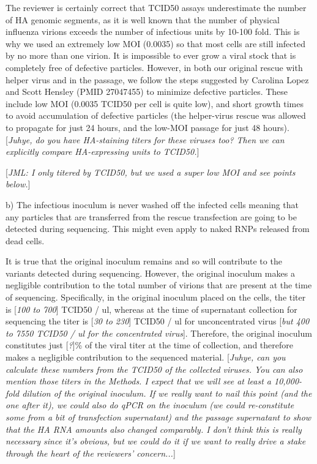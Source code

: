 \documentclass[11pt, oneside]{article}   	%
\newcommand{\comment}[1]{{\color{red}[\textsl{#1}]}}
\newcommand{\response}[1]{{\color{black}#1}}
\begin{document}
\response{The reviewer is certainly correct that TCID50 assays underestimate the number of HA genomic segments, as it is well known that the number of physical influenza virions exceeds the number of infectious units by 10-100 fold.
This is why we used an extremely low MOI (0.0035) so that most cells are still infected by no more than one virion.
It is impossible to ever grow a viral stock that is completely free of defective particles.
However, in both our original rescue with helper virus and in the passage, we follow the steps suggested by Carolina Lopez and Scott Hensley (PMID 27047455) to minimize defective particles.
These include low MOI (0.0035 TCID50 per cell is quite low), and short growth times to avoid accumulation of defective particles (the helper-virus rescue was allowed to propagate for just 24 hours, and the low-MOI passage for just 48 hours).
\comment{Juhye, do you have HA-staining titers for these viruses too? Then we can explicitly compare HA-expressing units to TCID50.}
}

\comment{JML: I only titered by TCID50, but we used a super low MOI and see points below.}

b) The infectious inoculum is never washed off the infected cells meaning that any particles that are transferred from the rescue transfection are going to be detected during sequencing. This might even apply to naked RNPs released from dead cells. 

\response{It is true that the original inoculum remains and so will contribute to the variants detected during sequencing.
However, the original inoculum makes a negligible contribution to the total number of virions that are present at the time of sequencing.
Specifically, in the original inoculum placed on the cells, the titer is \comment{100 to 700} TCID50 / ul, whereas at the time of supernatant collection for sequencing the titer is \comment{30 to 230} TCID50 / ul for unconcentrated virus \comment{but 400 to 7550 TCID50 / ul for the concentrated virus}.
Therefore, the original inoculum constitutes just \comment{?}\% of the viral titer at the time of collection, and therefore makes a negligible contribution to the sequenced material.
\comment{Juhye, can you calculate these numbers from the TCID50 of the collected viruses. 
You can also mention those titers in the Methods.
I expect that we will see at least a 10,000-fold dilution of the original inoculum.
If we really want to nail this point (and the one after it), we could also do qPCR on the inoculum (we could re-constitute some from a bit of transfection supernatant) and the passage supernatant to show that the HA RNA amounts also changed comparably.
I don't think this is really necessary since it's obvious, but we could do it if we want to really drive a stake through the heart of the reviewers' concern...}
}
\end{document}
